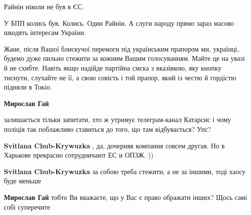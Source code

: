 \begin{itemize}
\begin{itemize}
Райнін ніколи не був в ЄС.

У БПП колись був. Колись. Один Райнін. А слуги народу прямо зараз масово
шкодять інтересам України.

Жане, після Вашої блискучої перемоги під українським прапором ми, українці,
будемо дуже пильно стежити за кожним Вашим голосуванням. Майте це на увазі й не
схибте. Навіть якщо надійде партійна смска з вказівкою, яку кнопку тиснути,
слухайте не її, а свою совість і той прапор, який із честю й гордістю підняли в
Токіо.


 
\textbf{Мирослав Гай} 

залишається тільки запитати, хто ж утримує телеграм-канал
Катарсис і чому поліція так поблажливо ставиться до того, що там
відбувається? Упс?


 

\textbf{Svitlana Chub-Krywuzka} , да, дочерняя компания совсем другая. Но в Харькове прекрасно сотрудничают ЕС и ОПЗЖ. ))

 
\textbf{Svitlana Chub-Krywuzka} за собою треба стежити, а не за іншими, тоді хаосу буде меньше

 
\textbf{Мирослав Гай} тобто Ви вважаєте, що у Вас є право ображати інших? Щось самі собі суперечите

 

\end{itemize}
\end{itemize}
